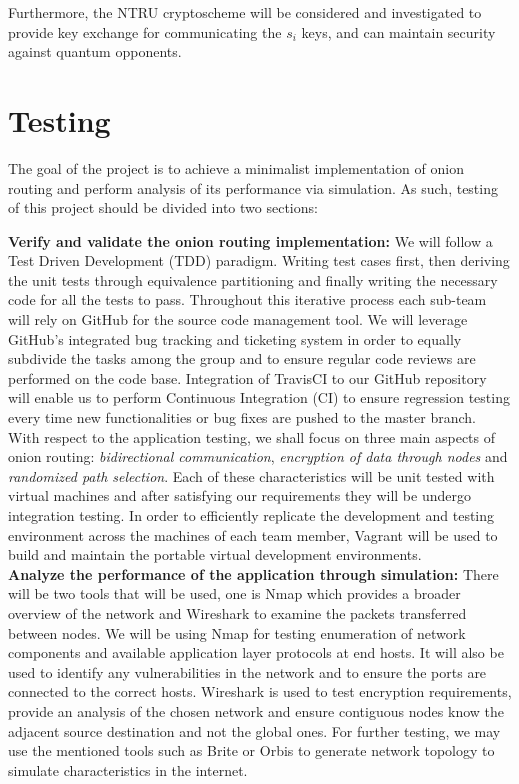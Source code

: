 \documentclass[10pt]{article}
\begin{document}
\noindent Furthermore, the NTRU cryptoscheme will be considered and investigated to
provide key exchange for communicating the $s_i$ keys, and can maintain
security against quantum opponents.


\section*{Testing}
The goal of the project is to achieve a minimalist implementation of onion
routing and perform analysis of its performance via simulation. As such,
testing of this project should be divided into two sections:

\noindent \textbf{Verify and validate the onion routing implementation:} We
will follow a Test Driven Development (TDD) paradigm. Writing test
cases first, then deriving the unit tests through equivalence
partitioning and finally writing the necessary code for all the tests
to pass. Throughout this iterative process each sub-team will rely on GitHub for the source code management tool. We will leverage GitHub's integrated bug tracking and ticketing system in
order to equally subdivide the tasks among the group and to ensure
regular code reviews are performed on the code base. Integration of TravisCI to our GitHub repository will enable us to perform Continuous Integration (CI) to ensure regression testing every time new functionalities or bug fixes are pushed to the master branch. With respect to
the application testing, we shall focus on three main aspects of onion
routing: \textit{bidirectional communication}, \textit{encryption
of data through nodes} and \textit{randomized path selection}. Each
of these characteristics will be unit tested with virtual machines and
after satisfying our requirements they will be undergo integration
testing. In order to efficiently replicate the development and testing
environment across the machines of each team member, Vagrant will be
used to build and maintain the portable virtual development
environments. \\

\noindent \textbf{Analyze the performance of the application through
simulation:} There will be two tools that will be used, one is Nmap
which provides a broader overview of the network and Wireshark to
examine the packets transferred between nodes. We will be using Nmap
for testing enumeration of network components and available application
layer protocols at end hosts. It will also be used to identify any
vulnerabilities in the network and to ensure the ports are connected to
the correct hosts. Wireshark is used to test encryption requirements,
provide an analysis of the chosen network and ensure contiguous nodes
know the adjacent source destination and not the global ones. For
further testing, we may use the mentioned tools such as Brite or Orbis
to generate network topology to simulate characteristics in the
internet.
\end{document}
